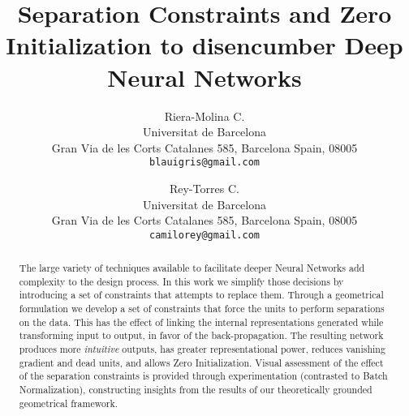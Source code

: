 \documentclass[10pt,twocolumn,letterpaper]{article}
\title{Separation Constraints and Zero Initialization to disencumber Deep Neural Networks}
\author{Riera-Molina C.\\
Universitat de Barcelona\\
Gran Via de les Corts Catalanes 585, Barcelona Spain, 08005\\
{\tt\small blauigris@gmail.com}
\and
Rey-Torres C.\\
Universitat de Barcelona\\
Gran Via de les Corts Catalanes 585, Barcelona Spain, 08005\\
{\tt\small camilorey@gmail.com}
}
\begin{document}
\maketitle
\begin{abstract}
The large variety of techniques available to facilitate deeper Neural Networks add complexity to the design process. In this work we simplify those decisions by introducing a set of constraints that attempts to replace them. Through a geometrical formulation we develop a set of constraints that force the units to perform separations on the data. This has the effect of linking the internal representations generated while transforming input to output, in favor of the back-propagation. The resulting network produces more \emph{intuitive} outputs, has greater representational power, reduces vanishing gradient and dead units, and allows Zero Initialization. Visual assessment of the effect of the separation constraints is provided through experimentation (contrasted to Batch Normalization), constructing insights from the results of our theoretically grounded geometrical framework. 
\end{abstract}








{\small


}
\end{document}
